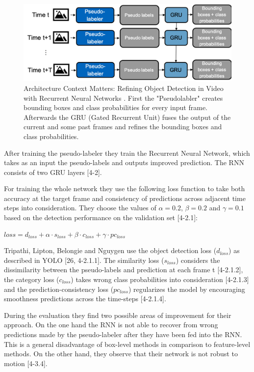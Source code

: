 \documentclass[conference]{IEEEtran}
\begin{document}
\begin{figure} [h]
\includegraphics[width=\columnwidth]{ContextMatters}
\caption{Architecture Context Matters: Refining Object Detection in Video with Recurrent Neural Networks \cite{b4}. First the "Pseudolabler" creates bounding boxes and class probabilities for every input frame. Afterwards the GRU (Gated Recurrent Unit) fuses the output of the current and some past frames and refines the bounding boxes and class probabilities.}
\end{figure}

After training the pseudo-labeler they train the Recurrent Neural Network, which takes as an input the pseudo-labels and outputs improved prediction. The RNN consists of two GRU layers [4-2]. \newline

For training the whole network they use the following loss function to take both accuracy at the target frame and consistency of predictions across adjacent time steps into consideration. They choose the values of $\alpha = 0.2$, $\beta = 0.2$ and $\gamma = 0.1$ based on the detection performance on the validation set [4-2.1]: \newline

$ loss = d_{loss} + \alpha \cdot s_{loss} + \beta \cdot c_{loss} + \gamma \cdot pc_{loss} $ \newline

Tripathi, Lipton, Belongie and Nguygen use the object detection loss ($d_{loss}$) as described in YOLO [26, 4-2.1.1]. The similarity loss ($s_{loss}$) considers the dissimilarity between the pseudo-labels and prediction at each frame t [4-2.1.2], the category loss ($c_{loss}$) takes wrong class probabilities into consideration [4-2.1.3] and the prediction-consistency loss ($pc_{loss}$) regularizes the model by encouraging smoothness predictions across the time-steps [4-2.1.4]. \newline

During the evaluation they find two possible areas of improvement for their approach. On the one hand the RNN is not able to recover from wrong predictions made by the pseudo-labeler after they have been fed into the RNN. This is a general disadvantage of box-level methods in comparison to feature-level methods. On the other hand, they observe that their network is not robust to motion [4-3.4]. \newline
\end{document}
